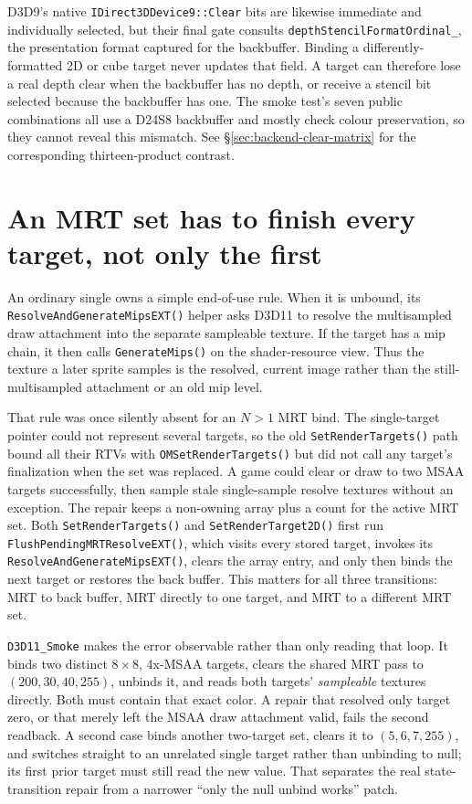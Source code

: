 D3D9's native \texttt{IDirect3DDevice9::Clear} bits are likewise immediate and individually
selected, but their final gate consults \texttt{depthStencilFormatOrdinal\_}, the presentation
format captured for the backbuffer. Binding a differently-formatted 2D or cube target never
updates that field. A target can therefore lose a real depth clear when the backbuffer has no
depth, or receive a stencil bit selected because the backbuffer has one. The smoke test's seven
public combinations all use a D24S8 backbuffer and mostly check colour preservation, so they
cannot reveal this mismatch. See \S\ref{sec:backend-clear-matrix} for the corresponding
thirteen-product contrast.

\section{An MRT set has to finish every target, not only the first}

An ordinary single  owns a simple end-of-use rule. When it is unbound,
its \texttt{ResolveAnd\allowbreak{}Generate\allowbreak{}MipsEXT()} helper asks D3D11 to resolve the
multisampled draw attachment into the separate sampleable texture. If the target
has a mip chain, it then calls \texttt{GenerateMips()} on the shader-resource view. Thus the
texture a later sprite samples is the resolved, current image rather than the still-multisampled
attachment or an old mip level.

That rule was once silently absent for an \(N>1\) MRT bind. The single-target pointer could not
represent several targets, so the old \texttt{SetRenderTargets()} path bound all their RTVs with
\texttt{OMSetRenderTargets()} but did not call any target's finalization when the set was
replaced. A game could clear or draw to two MSAA targets successfully, then sample stale
single-sample resolve textures without an exception. The repair keeps a non-owning array plus a
count for the active MRT set. Both \texttt{SetRenderTargets()} and
\texttt{SetRenderTarget2D()} first run \texttt{Flush\allowbreak{}Pending\allowbreak{}MRT\allowbreak{}ResolveEXT()}, which visits every
stored target, invokes its \texttt{ResolveAnd\allowbreak{}Generate\allowbreak{}MipsEXT()}, clears the array entry, and only
then binds the next target or restores the back buffer. This matters for all three transitions:
MRT to back buffer, MRT directly to one target, and MRT to a different MRT set.

\texttt{D3D11\_Smoke} makes the error observable rather than only reading that loop. It binds
two distinct \(8\times8\), 4x-MSAA targets, clears the shared MRT pass to
\((200,30,40,255)\), unbinds it, and reads both targets' \emph{sampleable} textures directly.
Both must contain that exact color. A repair that resolved only target zero, or that merely left
the MSAA draw attachment valid, fails the second readback. A second case binds another two-target
set, clears it to \((5,6,7,255)\), and switches straight to an unrelated single target rather
than unbinding to null; its first prior target must still read the new value. That separates the
real state-transition repair from a narrower ``only the null unbind works'' patch.


